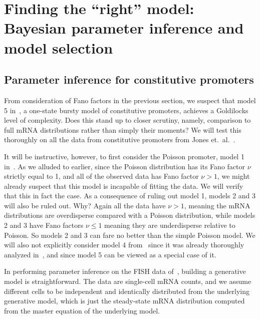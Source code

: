 \section{Finding the ``right'' model: Bayesian parameter inference and model selection}
\subsection{Parameter inference for constitutive promoters}

From consideration of Fano factors in the previous section, we suspect that
model 5 in~, a one-state bursty model of constitutive
promoters, achieves a Goldilocks level of complexity. Does this stand up to
closer scrutiny, namely, comparison to full mRNA distributions rather than
simply their moments? We will test this thoroughly on all the data from
constitutive promoters from Jones et.\ al.~\cite{Jones2014}.

It will be instructive, however, to first consider the Poisson promoter, model 1
in~. As we alluded to earlier, since the Poisson
distribution has its Fano factor $\nu$ strictly equal to 1,
and all of the observed data has Fano factor $\nu>1$, we might
already suspect that this model is incapable of fitting the data.
We will verify that this in fact the case. As a consequence
of ruling out model 1, models 2 and 3 will also be ruled out.
Why? Again all the data have $\nu>1$, meaning the mRNA distributions
are overdisperse compared with a Poisson distribution,
while models 2 and 3 have Fano factors $\nu\le 1$ meaning they
are underdisperse relative to Poisson. So models 2 and 3
can fare no better than the simple Poisson model. We will also not explicitly
consider model 4 from~ since it was already thoroughly
analyzed in~\cite{Razo-Mejia2020}, and since model 5 can be viewed as a special
case of it.

In performing parameter inference on the FISH data of~\cite{Jones2014}, building
a generative model is straightforward. The data are single-cell mRNA counts, and
we assume different cells to be independent and identically distributed from the
underlying generative model, which is just the steady-state mRNA distribution
computed from the master equation of the underlying model.

